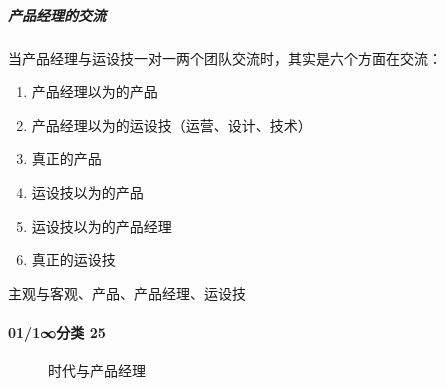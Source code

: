 \documentclass[letterpaper,11pt,english]{sphinxmanual}
\begin{document}
\subparagraph{产品经理的交流}
\label{\detokenize{chapter_introduction/PM:id33}}
当产品经理与运设技一对一两个团队交流时，其实是六个方面在交流：
\begin{enumerate}
%
\item {} 
产品经理以为的产品

\item {} 
产品经理以为的运设技（运营、设计、技术）

\item {} 
真正的产品

\item {} 
运设技以为的产品

\item {} 
运设技以为的产品经理

\item {} 
真正的运设技

\end{enumerate}

主观与客观、产品、产品经理、运设技


\paragraph{0\sphinxhyphen{}1/1\sphinxhyphen{}∞分类 25\sphinxfootnotemark[152]}
\label{\detokenize{chapter_introduction/PM:id34}}%
\begin{footnotetext}[152]\sphinxAtStartFootnote
{}
%
\end{footnotetext}\ignorespaces 
\begin{figure}[H]
\centering
\capstart

\noindent{}
\caption{时代与产品经理}\label{\detokenize{chapter_introduction/PM:id70}}\end{figure}

\begin{figure}[H]
\centering
\capstart

\noindent{}
\caption{\sphinxfootnotemark[153]}\label{\detokenize{chapter_introduction/PM:id71}}\end{figure}
%
\begin{footnotetext}[153]\sphinxAtStartFootnote
{}
%
\end{footnotetext}\ignorespaces 
\end{document}

